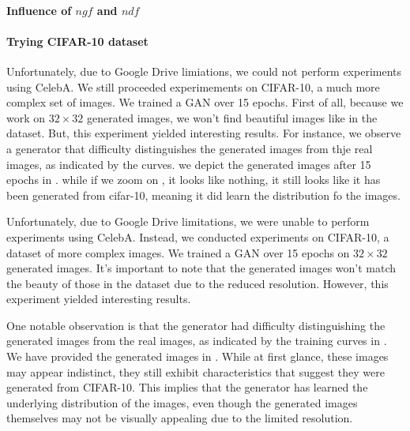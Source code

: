 
\paragraph*{Influence of $ngf$ and $ndf$}


\paragraph*{Trying CIFAR-10 dataset}

Unfortunately, due to Google Drive limiations, we could not perform experiments using CelebA. We still proceeded experimements on CIFAR-10, a much more complex set of images. We trained a GAN over 15 epochs. First of all, because we work on $32 \times 32$ generated images, we won't find beautiful images like in the dataset. But, this experiment yielded interesting results. For instance, we observe a generator that difficulty distinguishes the generated images from thje real images, as indicated by the curves. we depict the generated images after 15 epochs in . while if we zoom on , it looks like nothing, it still looks like it has been generated from cifar-10, meaning it did learn the distribution fo the images.

Unfortunately, due to Google Drive limitations, we were unable to perform experiments using CelebA. Instead, we conducted experiments on CIFAR-10, a dataset of more complex images. We trained a GAN over 15 epochs on $32 \times 32$ generated images. It's important to note that the generated images won't match the beauty of those in the dataset due to the reduced resolution. However, this experiment yielded interesting results.

One notable observation is that the generator had difficulty distinguishing the generated images from the real images, as indicated by the training curves in . We have provided the generated images in . While at first glance, these images may appear indistinct, they still exhibit characteristics that suggest they were generated from CIFAR-10. This implies that the generator has learned the underlying distribution of the images, even though the generated images themselves may not be visually appealing due to the limited resolution.

